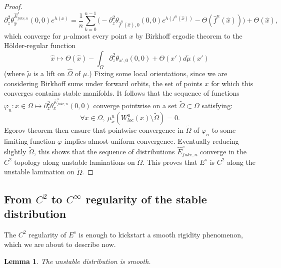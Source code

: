 \documentclass[a4paper]{article}
\newtheorem{lemma}[theorem]{Lemma}
\theoremstyle{definition}
\begin{document}
\begin{proof}
$$ \partial_z^2\theta_{\widehat{x}}^{\widehat{E}^s_{fake,n}}(0,0) e^{h(x)} = \frac{1}{n} \sum_{k=0}^{n-1} \Big(- \partial_z^2 \theta_{\widehat{f}^n(\widehat{x}),0}(0,0) e^{h(f^n(\widehat{x}))} - \Theta(\widehat{f}^n(\widehat{x})) \Big) + \Theta(\widehat{x}), $$
which converge for $\mu$-almost every point $x$ by Birkhoff ergodic theorem to the Hölder-regular function
$$ \widehat{x} \mapsto \Theta(\widehat{x}) - \int_{\widehat{\Omega}} \partial_z^2 \theta_{x',0}(0,0) + \Theta(x') d\tilde{\mu}(x')$$ (where $\tilde{\mu}$ is a lift on $\widehat{\Omega}$ of $\mu$.) Fixing some local orientations, since we are considering Birkhoff sums under forward orbits, the set of points $x$ for which this converges contains stable manifolds. It follows that the sequence of functions $\varphi_n : x \in \Omega \mapsto \partial_z^2\theta_{x}^{\widehat{E}^s_{fake,n}}(0,0)$ converge pointwise on a set $\tilde{\Omega} \subset \Omega$ satisfying:
$$ \forall x \in \Omega, \ \mu_x^u( W^u_{loc}(x) \setminus \tilde{\Omega} ) = 0. $$
Egorov theorem then ensure that pointwise convergence in $\tilde{\Omega}$ of $\varphi_n$ to some limiting function $\varphi$ implies almost uniform convergence. Eventually reducing slightly $\tilde{\Omega}$, this shows that the sequence of distributions $\widehat{E}_{fake,n}^s$ 
converge in the $C^2$ topology along unstable laminations on $\tilde{\Omega}$. This proves that $E^s$ is $C^2$ along the unstable lamination on $\tilde{\Omega}$. \end{proof}



\subsection{From $C^2$ to $C^\infty$ regularity of the stable distribution}

The $C^2$ regularity of $E^s$ is enough to kickstart a smooth rigidity phenomenon, which we are about to describe now.

\begin{lemma}
The unstable distribution is smooth.
\end{lemma}
\end{document}
